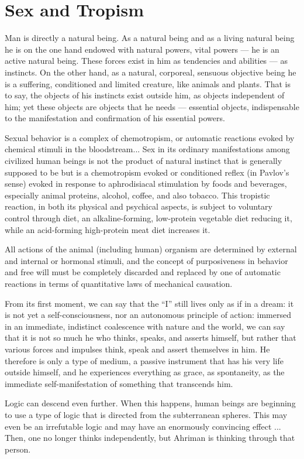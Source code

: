 \section{Sex and Tropism}

\begin{quotex}
Man is directly a natural being. As a natural being and as a living natural being he is on the one hand endowed with natural powers, vital powers --- he is an active natural being. These forces exist in him as tendencies and abilities --- as instincts. On the other hand, as a natural, corporeal, sensuous objective being he is a suffering, conditioned and limited creature, like animals and plants. That is to say, the objects of his instincts exist outside him, as objects independent of him; yet these objects are objects that he needs --- essential objects, indispensable to the manifestation and confirmation of his essential powers.

Sexual behavior is a complex of chemotropism, or automatic reactions evoked by chemical stimuli in the bloodstream... Sex in its ordinary manifestations among civilized human beings is not the product of natural instinct that is generally supposed to be but is a chemotropism evoked or conditioned reflex (in Pavlov's sense) evoked in response to aphrodisiacal stimulation by foods and beverages, especially animal proteins, alcohol, coffee, and also tobacco. This tropistic reaction, in both its physical and psychical aspects, is subject to voluntary control through diet, an alkaline-forming, low-protein vegetable diet reducing it, while an acid-forming high-protein meat diet increases it.

All actions of the animal (including human) organism are determined by external and internal or hormonal stimuli, and the concept of purposiveness in behavior and free will must be completely discarded and replaced by one of automatic reactions in terms of quantitative laws of mechanical causation.

From its first moment, we can say that the ``I'' still lives only as if in a dream: it is not yet a self-consciousness, nor an autonomous principle of action: immersed in an immediate, indistinct coalescence with nature and the world, we can say that it is not so much he who thinks, speaks, and asserts himself, but rather that various forces and impulses think, speak and assert themselves in him. He therefore is only a type of medium, a passive instrument that has his very life outside himself, and he experiences everything as grace, as spontaneity, as the immediate self-manifestation of something that transcends him.

Logic can descend even further. When this happens, human beings are beginning to use a type of logic that is directed from the subterranean spheres. This may even be an irrefutable logic and may have an enormously convincing effect ... Then, one no longer thinks independently, but Ahriman is thinking through that person.
\end{quotex}


